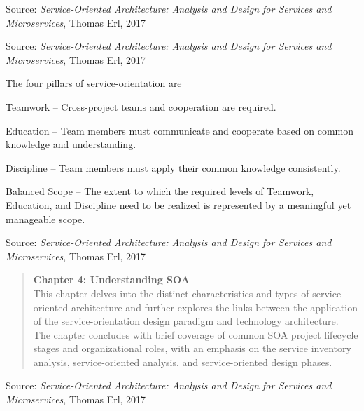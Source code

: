 \documentclass[Screen16to9,17pt]{foils}
\begin{document}
Source: \emph{Service‑Oriented Architecture: Analysis and Design for Services and Microservices}, Thomas Erl, 2017




Source: \emph{Service‑Oriented Architecture: Analysis and Design for Services and Microservices}, Thomas Erl, 2017





The four pillars of service-orientation are
\begin{list2}
\item Teamwork – Cross-project teams and cooperation are required.
\item Education – Team members must communicate and cooperate based on common knowledge and understanding.
\item Discipline – Team members must apply their common knowledge consistently.
\item Balanced Scope – The extent to which the required levels of Teamwork, Education, and Discipline need to be realized is represented by a meaningful yet manageable scope.
\end{list2}
Source: \emph{Service‑Oriented Architecture: Analysis and Design for Services and Microservices}, Thomas Erl, 2017


\begin{quote}
{\bf Chapter 4: Understanding SOA}\\
This chapter delves into the distinct characteristics and types of service-oriented architecture and further explores the links between the application of the service-orientation design paradigm and technology architecture. The chapter concludes with brief coverage of common SOA project lifecycle stages and organizational roles, with an emphasis on the service inventory analysis, service-oriented analysis, and service-oriented design
phases.
\end{quote}
Source: \emph{Service‑Oriented Architecture: Analysis and Design for Services and Microservices}, Thomas Erl, 2017



\end{document}
